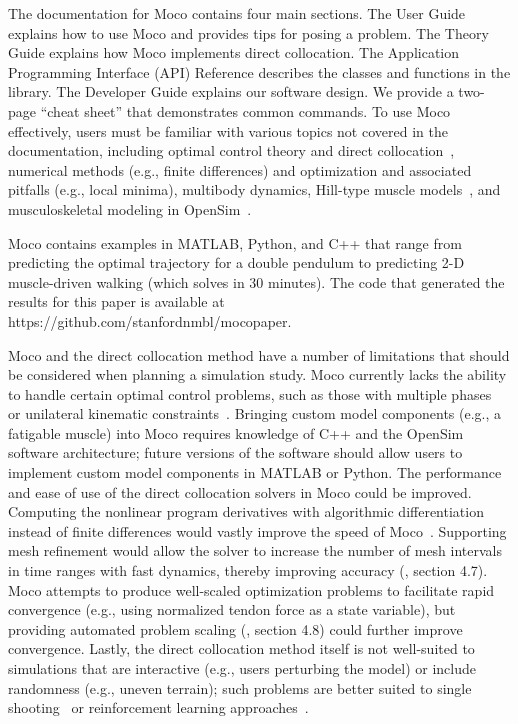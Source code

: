 \documentclass[10pt,letterpaper]{article}
\begin{document}
The documentation for Moco contains four main sections. The User Guide explains how to use Moco and provides tips for posing a problem. The Theory Guide explains how Moco implements direct collocation. The Application Programming Interface (API) Reference describes the classes and functions in the library. The Developer Guide explains our software design. We provide a two-page ``cheat sheet'' that demonstrates common commands. To use Moco effectively, users must be familiar with various topics not covered in the documentation, including optimal control theory and direct collocation~\cite{Betts:2010}, numerical methods (e.g., finite differences) and optimization and associated pitfalls (e.g., local minima), multibody dynamics, Hill-type muscle models~\cite{Groote:2016dq}, and musculoskeletal modeling in OpenSim~\cite{Seth:2018gg}.

Moco contains examples in MATLAB, Python, and C++ that range from predicting the optimal trajectory for a double pendulum to predicting 2-D muscle-driven walking (which solves in 30 minutes). The code that generated the results for this paper is available at https://github.com/stanfordnmbl/mocopaper.

Moco and the direct collocation method have a number of limitations that should be considered when planning a simulation study. Moco currently lacks the ability to handle certain optimal control problems, such as those with multiple phases~\cite{Falisse:2017} or unilateral kinematic constraints~\cite{Patel:2019}. Bringing custom model components (e.g., a fatigable muscle) into Moco requires knowledge of C++ and the OpenSim software architecture; future versions of the software should allow users to implement custom model components in MATLAB or Python. The performance and ease of use of the direct collocation solvers in Moco could be improved. Computing the nonlinear program derivatives with algorithmic differentiation instead of finite differences would vastly improve the speed of Moco~\cite{Falisse:2019a}. Supporting mesh refinement would allow the solver to increase the number of mesh intervals in time ranges with fast dynamics, thereby improving accuracy (\hspace{1sp}\cite{Betts:2010}, section 4.7). Moco attempts to produce well-scaled optimization problems to facilitate rapid convergence (e.g., using normalized tendon force as a state variable), but providing automated problem scaling (\hspace{1sp}\cite{Betts:2010}, section 4.8) could further improve convergence. Lastly, the direct collocation method itself is not well-suited to simulations that are interactive (e.g., users perturbing the model) or include randomness (e.g., uneven terrain); such problems are better suited to single shooting~\cite{Ong:2019} or reinforcement learning approaches~\cite{Kidzinski:2019}.
\end{document}
